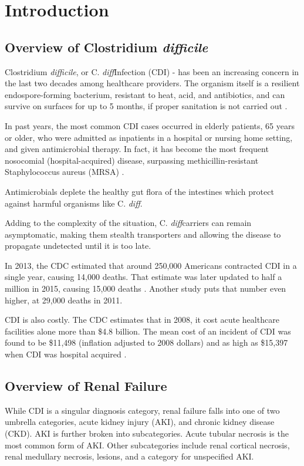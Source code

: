 \documentclass[12pt]{ociamthesis}\usepackage[]{graphicx}\usepackage[]{color}
\newcommand{\cdifficile}{Clostridium \textit{difficile}}
\newcommand{\cdiff}{C. \textit{diff}}
\begin{document}
\chapter{Introduction}

\section{Overview of \cdifficile}

\cdifficile, or \cdiff Infection (CDI) -
has been an increasing concern in the last two decades among healthcare providers. 
The organism itself is a resilient endospore-forming bacterium, resistant to heat, acid, and antibiotics,
and can survive on surfaces for up to 5 months, if proper sanitation is not carried out \cite{Gerding2008}.

In past years, the most common CDI cases occurred in elderly patients, 65 years or older,
who were admitted as inpatients in a hospital or nursing home setting, and given antimicrobial therapy.
In fact, it has become the most frequent nosocomial (hospital-acquired) disease, surpassing
methicillin-resistant Staphylococcus aureus (MRSA) \cite{Gupta2014}.

Antimicrobials deplete the healthy gut flora of the intestines which protect against harmful organisms like \cdiff \cite{Lamont2017}.

Adding to the complexity of the situation, \cdiff carriers can remain asymptomatic, making them stealth transporters
and allowing the disease to propagate undetected until it is too late. 

In 2013, the CDC estimated that around 250,000 Americans contracted CDI in a single year, causing 14,000 deaths.
That estimate was later updated to half a million in 2015, causing 15,000 deaths \cite{CDC2015, CDC2018}.
Another study puts that number even higher, at 29,000 deaths in 2011. 

CDI is also costly. The CDC estimates that in 2008, it cost acute healthcare facilities alone more than \$4.8 billion.
The mean cost of an incident of CDI was found to be \$11,498 (inflation adjusted to 2008 dollars)
and as high as \$15,397 when CDI was hospital acquired \cite{Dubberke2012}.


\section{Overview of Renal Failure}

While CDI is a singular diagnosis category, renal failure falls into one of two umbrella categories, acute kidney injury (AKI), 
and chronic kidney disease (CKD). AKI is further broken into subcategories. Acute tubular necrosis is the most common form of AKI.
Other subcategories include renal cortical necrosis, renal medullary necrosis, lesions, and a category for unspecified AKI. 
\end{document}
